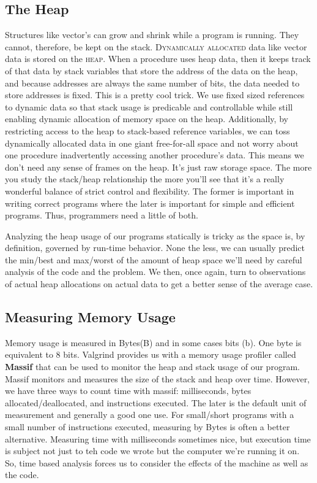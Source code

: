 \documentclass[]{tufte-handout}
\begin{document}
\subsection{The Heap}

Structures like vector's can grow and shrink while a program is running. They cannot, therefore, be kept on the stack. \textsc{Dynamically allocated} data like vector data is stored on the \textsc{heap}.  When a procedure uses heap data, then it keeps track of that data by stack variables that store the address of the data on the heap, and because addresses are always the same number of bits, the data needed to store addresses is fixed.  This is a pretty cool trick. We use fixed sized references to dynamic data so that stack usage is predicable and controllable while still enabling dynamic allocation of memory space on the heap. Additionally, by restricting access to the heap to stack-based reference variables, we can toss dynamically allocated data in one giant free-for-all space and not worry about one procedure inadvertently accessing another procedure's data. This means we don't need any sense of frames on the heap. It's just raw storage space. The more you study the stack/heap relationship the more you'll see that it's a really wonderful balance of strict control and flexibility.  The former is important in writing correct programs where the later is important for simple and efficient programs. Thus, programmers need a little of both.

Analyzing the heap usage of our programs statically is tricky as the space is, by definition, governed by run-time behavior.  None the less, we can usually predict the min/best and max/worst of the amount of heap space we'll need by careful analysis of the code and the problem.  We then, once again, turn to observations of actual heap allocations on actual data to get a better sense of the average case. 

\subsection{Measuring Memory Usage}

Memory usage is measured in Bytes(B) and in some cases bits (b).  One byte is equivalent to 8 bits. Valgrind provides us with a memory usage profiler called \textbf{Massif} that can be used to monitor the heap and stack usage of our program.  Massif monitors and measures the size of the stack and heap over time. However, we have three ways to count time with massif: milliseconds, bytes allocated/deallocated, and instructions executed. The later is the default unit of measurement and generally a good one use.  For small/short programs with a small number of instructions executed, measuring by Bytes is often a better alternative.  Measuring time with milliseconds sometimes nice, but execution time is subject not just to teh code we wrote but the  computer we're running it on. So, time based analysis forces us to consider the effects of the machine as well as the code. 
\end{document}
